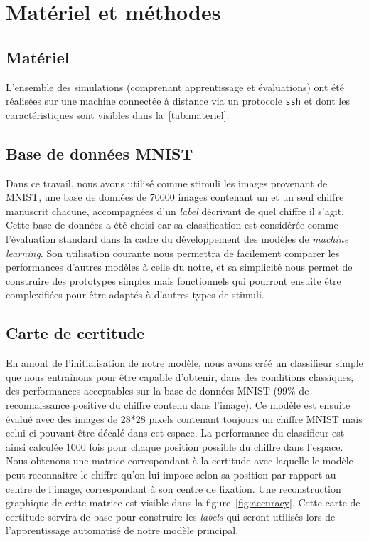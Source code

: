 \chapter{Matériel et méthodes} %
\label{Materiel_methode} %

\section{Matériel}
L'ensemble des simulations (comprenant apprentissage et évaluations) ont été réalisées sur une machine connectée à distance via un protocole \verb+ssh+ et dont les caractéristiques sont visibles dans la~\autoref{tab:materiel}.

\section{Base de données MNIST}
Dans ce travail, nous avons utilisé comme stimuli les images provenant de MNIST, une base de données de 70000 images contenant un et un seul chiffre manuscrit chacune, accompagnées d'un \textit{label} décrivant de quel chiffre il s'agit. 
Cette base de données a été choisi car sa classification est considérée comme l'évaluation standard dans la cadre du développement des modèles de \textit{machine learning}. Son utilisation courante nous permettra de facilement comparer les performances d'autres modèles à celle du notre, et sa simplicité nous permet de construire des prototypes simples mais fonctionnels qui pourront ensuite être complexifiées pour être adaptés à d'autres types de stimuli.

\section{Carte de certitude}
En amont de l'initialisation de notre modèle, nous avons créé un classifieur simple que nous entraînons pour être capable d'obtenir, dans des conditions classiques, des performances acceptables sur la base de données MNIST (99\% de reconnaissance positive du chiffre contenu dans l'image).
Ce modèle est ensuite évalué avec des images de 28*28 pixels contenant toujours un  chiffre MNIST mais celui-ci pouvant être décalé dans cet espace.
La performance du classifieur est ainsi calculée 1000 fois pour chaque position possible du chiffre dans l'espace. 
Nous obtenons une matrice correspondant à la certitude avec laquelle le modèle peut reconnaitre le chiffre qu'on lui impose selon sa position par rapport au centre de l'image, correspondant à son centre de fixation.
Une reconstruction graphique de cette matrice est visible dans la figure~\ref{fig:accuracy}.
Cette carte de certitude servira de base pour construire les \textit{labels} qui seront utilisés lors de l'apprentissage automatisé de notre modèle principal.

